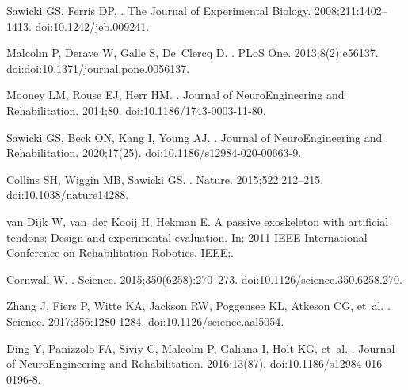 \documentclass[10pt,letterpaper]{article}
\begin{document}
\begin{thebibliography}{10}

Sawicki GS, Ferris DP.
.
\newblock The Journal of Experimental Biology. 2008;211:1402--1413.
\newblock doi:{10.1242/jeb.009241}.

Malcolm P, Derave W, Galle S, De~Clercq D.
.
\newblock PLoS One. 2013;8(2):e56137.
\newblock doi:{doi:10.1371/journal.pone.0056137}.

Mooney LM, Rouse EJ, Herr HM.
.
\newblock Journal of NeuroEngineering and Rehabilitation. 2014;80.
\newblock doi:{10.1186/1743-0003-11-80}.

Sawicki GS, Beck ON, Kang I, Young AJ.
.
\newblock Journal of NeuroEngineering and Rehabilitation. 2020;17(25).
\newblock doi:{10.1186/s12984-020-00663-9}.

Collins SH, Wiggin MB, Sawicki GS.
.
\newblock Nature. 2015;522:212--215.
\newblock doi:{10.1038/nature14288}.

van Dijk W, van~der Kooij H, Hekman E.
\newblock A passive exoskeleton with artificial tendons: Design and
  experimental evaluation.
\newblock In: 2011 IEEE International Conference on Rehabilitation Robotics.
  IEEE;.

Cornwall W.
.
\newblock Science. 2015;350(6258):270--273.
\newblock doi:{10.1126/science.350.6258.270}.

Zhang J, Fiers P, Witte KA, Jackson RW, Poggensee KL, Atkeson CG, et~al.
.
\newblock Science. 2017;356:1280-1284.
\newblock doi:{10.1126/science.aal5054}.

Ding Y, Panizzolo FA, Siviy C, Malcolm P, Galiana I, Holt KG, et~al.
.
\newblock Journal of NeuroEngineering and Rehabilitation. 2016;13(87).
\newblock doi:{10.1186/s12984-016-0196-8}.


\end{thebibliography}
\end{document}
